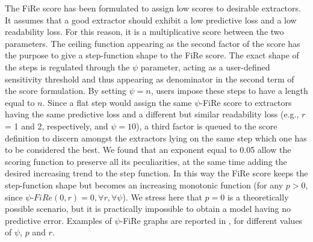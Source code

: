 \documentclass{article}
\newcommand{\fire}{FiRe}
\newcommand{\psifire}{$\psi$-\fire}
\begin{document}
The \fire{} score has been formulated to assign low scores to desirable extractors.
%
It assumes that a good extractor should exhibit a low predictive loss and a low readability loss.
%
For this reason, it is a multiplicative score between the two parameters.
%
The ceiling function appearing as the second factor of the score has the purpose to give a step-function shape to the \fire{} score.
%
The exact shape of the steps is regulated through the $\psi$ parameter, acting as a user-defined sensitivity threshold and thus appearing as denominator in the second term of the score formulation.
%
By setting $\psi=n$, users impose these steps to have a length equal to $n$.
%
Since a flat step would assign the same \psifire{} score to extractors having the same predictive loss and a different but similar readability loss (e.g., $r$ = 1 and 2, respectively, and $\psi=10$), a third factor is queued to the score definition to discern amongst the extractors lying on the same step which one has to be considered the best.
%
We found that an exponent equal to 0.05 allow the scoring function to preserve all its peculiarities, at the same time adding the desired increasing trend to the step function.
%
In this way the \fire{} score keeps the step-function shape but becomes an increasing monotonic function (for any $p>0$, since $\psi\textrm{-}\fire{}(0, r)=0, \forall r, \forall \psi$).
%
We stress here that $p=0$ is a theoretically possible scenario, but it is practically impossible to obtain a model having no predictive error.
%
Examples of \psifire{} graphs are reported in , for different values of $\psi$, $p$ and $r$.

\end{document}
